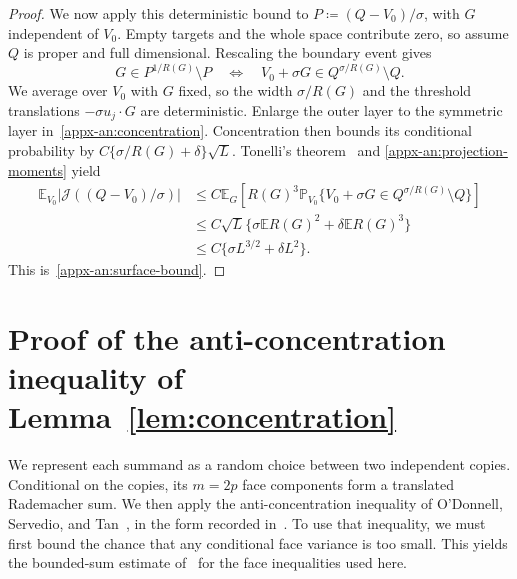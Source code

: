 \documentclass[11pt,letterpaper]{article}
\theoremstyle{remark}
\newcommand{\E}{\mathbb E}
\newcommand{\Pp}{\mathbb P}
\newcommand{\surf}{\mathcal J}
\begin{document}
\begin{proof}
We now apply this deterministic bound to \(P\coloneqq (Q-V_0)/\sigma\),
with \(G\) independent of \(V_0\). Empty targets and the whole space
contribute zero, so assume \(Q\) is proper and full dimensional.
Rescaling the boundary event gives
\[
 G\in P^{1/R(G)}\setminus P
 \quad\Longleftrightarrow\quad
 V_0+\sigma G\in Q^{\sigma/R(G)}\setminus Q.
\]
We average over \(V_0\) with \(G\) fixed, so the width
\(\sigma/R(G)\) and the threshold translations
\(-\sigma u_j\cdot G\) are deterministic. Enlarge the outer layer
to the symmetric layer in~\eqref{appx-an:concentration}. Concentration then
bounds its conditional probability by
\(C\{\sigma/R(G)+\delta\}\sqrt L\). Tonelli's
theorem~\cite[Section~2.5]{Folland1999} and
\eqref{appx-an:projection-moments} yield
\begin{align*}
 \E_{V_0}|\surf((Q-V_0)/\sigma)|
 &\le C\E_G\left[R(G)^3
       \Pp_{V_0}\{V_0+\sigma G\in Q^{\sigma/R(G)}\setminus Q\}\right]\\
 &\le C\sqrt L\{\sigma\E R(G)^2+\delta\E R(G)^3\}\\
 &\le C\{\sigma L^{3/2}+\delta L^2\}.
\end{align*}
This is~\eqref{appx-an:surface-bound}.
\end{proof}

\section{\texorpdfstring{Proof of the anti-concentration inequality of Lemma~\ref{lem:concentration}}{Proof of the anti-concentration inequality of Lemma 1}}\label{appx-app:concentration}
\label{appx-conc:conditioning}

We represent each summand as a random choice between two independent
copies. Conditional on the copies, its \(m=2p\) face components
form a translated Rademacher sum. We then apply the anti-concentration
inequality of O'Donnell, Servedio, and Tan~\cite{OST}, in the form
recorded in~\cite[Lemma~J.4]{CCKK2022}. To use that inequality,
we must first bound the chance that any conditional face variance is
too small. This yields the bounded-sum estimate of~\cite[Lemma~2.1]{AL}
for the face inequalities used here.
\end{document}
